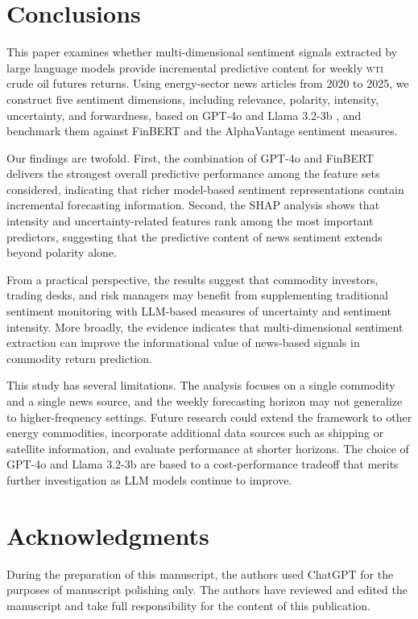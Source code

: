 \documentclass[preprint,12pt,authoryear]{elsarticle}
\newcommand{\wti}{\textsc{wti}}
\newcommand{\gpt}{GPT-4o }
\newcommand{\llama}{Llama 3.2-3b }
\newcommand{\finbert}{FinBERT }
\begin{document}
\section{Conclusions}
\label{SecConclusion}

This paper examines whether multi-dimensional sentiment signals extracted by large language models provide incremental predictive content for weekly \wti{} crude oil futures returns. Using energy-sector news articles from 2020 to 2025, we construct five sentiment dimensions, including relevance, polarity, intensity, uncertainty, and forwardness, based on \gpt and \llama, and benchmark them against \finbert and the AlphaVantage sentiment measures.

Our findings are twofold. First, the combination of \gpt and \finbert delivers the strongest overall predictive performance among the feature sets considered, indicating that richer model-based sentiment representations contain incremental forecasting information. Second, the SHAP analysis shows that intensity and uncertainty-related features rank among the most important predictors, suggesting that the predictive content of news sentiment extends beyond polarity alone.

From a practical perspective, the results suggest that commodity investors, trading desks, and risk managers may benefit from supplementing traditional sentiment monitoring with LLM-based measures of uncertainty and sentiment intensity. More broadly, the evidence indicates that multi-dimensional sentiment extraction can improve the informational value of news-based signals in commodity return prediction.

This study has several limitations. The analysis focuses on a single commodity and a single news source, and the weekly forecasting horizon may not generalize to higher-frequency settings. Future research could extend the framework to other energy commodities, incorporate additional data sources such as shipping or satellite information, and evaluate performance at shorter horizons. The choice of  \gpt and \llama are based to a cost-performance tradeoff that merits further investigation as LLM models continue to improve.

\section*{Acknowledgments}
During the preparation of this manuscript, the authors used ChatGPT for the purposes of manuscript polishing only. The authors have reviewed and edited the manuscript and take full responsibility for the content of this publication.
\end{document}
